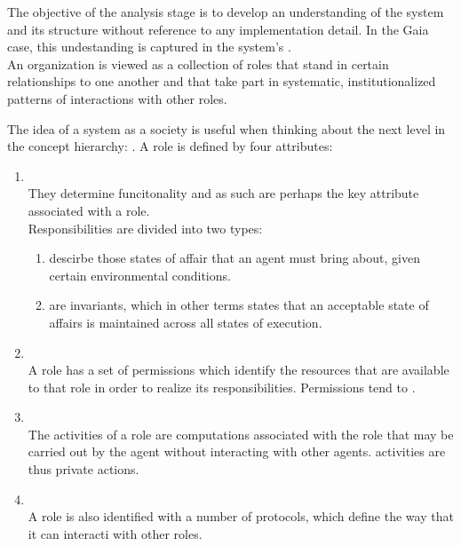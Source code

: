 The objective of the analysis stage is to develop an understanding of the system and its structure without reference to any implementation detail. In the Gaia case, this undestanding is captured in the system's .\\
An organization is viewed as a collection of roles that stand in certain relationships to one another and that take part in systematic, institutionalized patterns of interactions with other roles.

The idea of a system as a society is useful when thinking about the next level in the concept hierarchy: . A role is defined by four attributes: 
\begin{enumerate}
\item {}\\
They determine funcitonality and as such are perhaps the key attribute associated with a role.\\
Responsibilities are divided into two types:
\begin{enumerate}
\item {} descirbe those states of affair that an agent must bring about, given certain environmental conditions.
\item {} are invariants, which in other terms states that an acceptable state of affairs is maintained across all states of execution.
\end{enumerate}
\item {}\\
A role has a set of permissions which identify the resources that are available to that role in order to realize its responsibilities. Permissions tend to .
\item {}\\
The activities of a role are computations associated with the role that may be carried out by the agent without interacting with other agents. activities are thus private actions.
\item {}\\
A role is also identified with a number of protocols, which define the way that it can interacti with other roles.
\end{enumerate}
